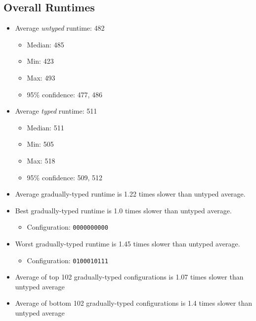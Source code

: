 \documentclass{article}
\newcommand{\mono}[1]{\texttt{#1}}
\begin{document}
\subsection{Overall Runtimes}
\begin{itemize}
\item Average \emph{untyped} runtime: 482
  \begin{itemize}
  \item Median: 485
  \item Min: 423
  \item Max: 493
  \item 95\% confidence: 477, 486
  \end{itemize}
\item Average \emph{typed} runtime: 511
  \begin{itemize}
  \item Median: 511
  \item Min: 505
  \item Max: 518
  \item 95\% confidence: 509, 512
  \end{itemize}
\item Average gradually-typed runtime is 1.22 times slower than untyped average.
\item Best gradually-typed runtime is 1.0 times slower than untyped average.
\begin{itemize}\item Configuration: \mono{0000000000}\end{itemize}
\item Worst gradually-typed runtime is 1.45 times slower than untyped average.
\begin{itemize}\item Configuration: \mono{0100010111}\end{itemize}
\item Average of top 102 gradually-typed configurations is 1.07 times slower than untyped average
\item Average of bottom 102 gradually-typed configurations is 1.4 times slower than untyped average
\end{itemize}
\end{document}
